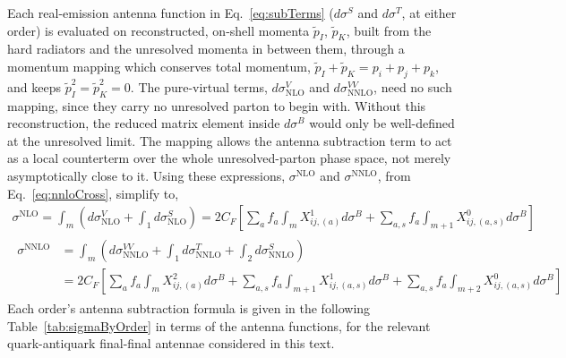 Each real-emission antenna function in Eq.~\eqref{eq:subTerms} ($d\sigma^S$ and
$d\sigma^T$, at either order) is evaluated on reconstructed, on-shell momenta
$\tilde p_I$, $\tilde p_K$, built from the hard radiators and the unresolved
momenta in between them, through a momentum mapping which conserves total
momentum, $\tilde p_I+\tilde p_K=p_i+p_j+p_k$, and keeps
$\tilde p_I^2=\tilde p_K^2=0$. The pure-virtual terms, $d\sigma^V_\text{NLO}$
and $d\sigma^{VV}_\text{NNLO}$, need no such mapping, since they carry no
unresolved parton to begin with.
Without this reconstruction, the reduced matrix element inside $d\sigma^B$ would only
be well-defined at the unresolved limit. The mapping allows the
antenna subtraction term to act as a local counterterm over the whole unresolved-parton
phase space, not merely asymptotically close to it.
Using these expressions, $\sigma^\text{NLO}$ and $\sigma^\text{NNLO}$, from Eq.~\eqref{eq:nnloCross}, simplify to,
\begin{equation}
    \begin{gathered}
        \sigma^\text{NLO}=\int_m\left(d\sigma^{V}_\text{NLO}+\int_1 d\sigma^S_\text{NLO}\right)=2C_F\left[\sum_{a}f_a\int_{m}X_{ij,(a)}^1d\sigma^B+\sum_{a,s}f_a\int_{m+1}X_{ij,(a,s)}^0d\sigma^B\right]\\
        \begin{aligned}
            \sigma^\text{NNLO}&=\int_m\left(d\sigma^{VV}_\text{NNLO}+\int_1d\sigma^T_\text{NNLO}+\int_2 d\sigma^S_\text{NNLO}\right)\\
                              &=2C_F\left[\sum_{a}f_a\int_{m}X_{ij,(a)}^2d\sigma^B+\sum_{a,s}f_a\int_{m+1}X_{ij,(a,s)}^1d\sigma^B+\sum_{a,s}f_a\int_{m+2}X_{ij,(a,s)}^0d\sigma^B\right]
        \end{aligned}
    \end{gathered}
\end{equation}
Each order's antenna subtraction formula is
given in the following Table~\ref{tab:sigmaByOrder} in terms of the antenna functions,
for the relevant quark-antiquark final-final antennae considered
in this text.

